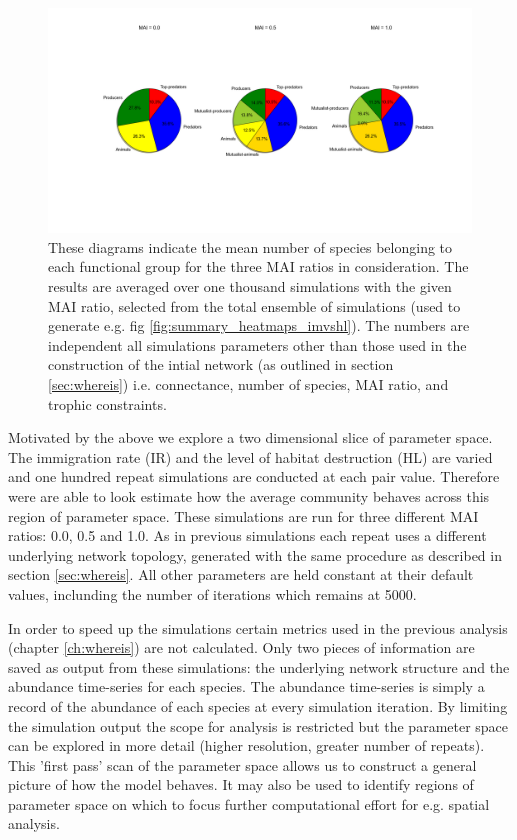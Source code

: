 \begin{itemize}
\begin{figure}
	\hspace{-2.5cm}
	\includegraphics[width=1.3\linewidth]{"./chapters/chapter04/figures/init_proportions"}
	\caption{These diagrams indicate the mean number of species belonging to each functional group for the three MAI ratios in consideration. The results are averaged over one thousand simulations with the given MAI ratio, selected from the total ensemble of simulations (used to generate e.g. fig \ref{fig:summary_heatmaps_imvshl}). The numbers are independent all simulations parameters other than those used in the construction of the intial network (as outlined in section \ref{sec:whereis}) i.e. connectance, number of species, MAI ratio, and trophic constraints. }
	\label{fig:initial_proportions}
\end{figure}


Motivated by the above we explore a two dimensional slice of parameter space. The immigration rate (IR) and the level of habitat destruction (HL) are varied and one hundred repeat simulations are conducted at each pair value. Therefore were are able to look estimate how the average community behaves across this region of parameter space. These simulations are run for three different MAI ratios: 0.0, 0.5 and 1.0. As in previous simulations each repeat uses a different underlying network topology, generated with the same procedure as described in section \ref{sec:whereis}.  All other parameters are held constant at their default values, inclunding the number of iterations which remains at 5000. 

In order to speed up the simulations certain metrics used in the previous analysis (chapter \ref{ch:whereis}) are not calculated. Only two pieces of information are saved as output from these simulations: the underlying network structure and the abundance time-series for each species. The abundance time-series is simply a record of the abundance of each species at every simulation iteration. By limiting the simulation output the scope for analysis is restricted but the parameter space can be explored in more detail (higher resolution, greater number of repeats). This 'first pass' scan of the parameter space allows us to construct a general picture of how the model behaves. It may also be used to identify regions of parameter space on which to focus further computational effort for e.g. spatial analysis.


\end{itemize}
